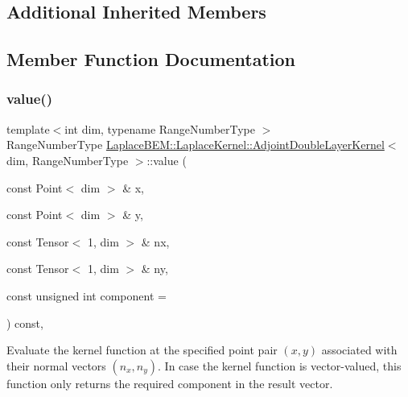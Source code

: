\subsection*{Additional Inherited Members}


\subsection{Member Function Documentation}
\mbox{\label{classLaplaceBEM_1_1LaplaceKernel_1_1AdjointDoubleLayerKernel_acfa06279ea767680f2fbefee07a34304}} 
\subsubsection{\texorpdfstring{value()}{value()}}
{\footnotesize\ttfamily template$<$int dim, typename Range\+Number\+Type $>$ \\
Range\+Number\+Type \hyperlink{classLaplaceBEM_1_1LaplaceKernel_1_1AdjointDoubleLayerKernel}{Laplace\+B\+E\+M\+::\+Laplace\+Kernel\+::\+Adjoint\+Double\+Layer\+Kernel}$<$ dim, Range\+Number\+Type $>$\+::value (\begin{DoxyParamCaption}\item[{const Point$<$ dim $>$ \&}]{x,  }\item[{const Point$<$ dim $>$ \&}]{y,  }\item[{const Tensor$<$ 1, dim $>$ \&}]{nx,  }\item[{const Tensor$<$ 1, dim $>$ \&}]{ny,  }\item[{const unsigned int}]{component = {} }\end{DoxyParamCaption}) const\hspace{0.3cm}{\ttfamily [override]}, {\ttfamily [virtual]}}

Evaluate the kernel function at the specified point pair $(x, y)$ associated with their normal vectors $(n_x, n_y)$. In case the kernel function is vector-\/valued, this function only returns the required {\ttfamily component} in the result vector.


